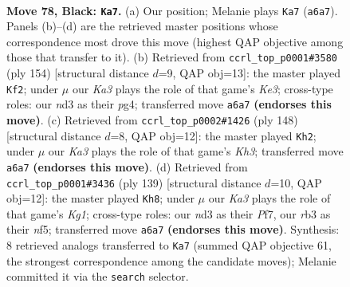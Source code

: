 \documentclass[11pt]{article}
\begin{document}
\clearpage

\begin{figure}[p]\centering
\begin{subfigure}{0.46\textwidth}\centering
\resizebox{\linewidth}{!}{%
\newchessgame
\chessboard[
  setfen={8/8/k7/8/7K/1R1N4/6P1/3r4 b - - 21 78},
  showmover=false,
  pgfstyle=straightmove, color=movearrow, markmove={a6-a7}
]}
\caption{}
\end{subfigure}\hfill
\begin{subfigure}{0.46\textwidth}\centering
\resizebox{\linewidth}{!}{%
\newchessgame
\chessboard[
  setfen={8/4k3/7P/6R1/r5p1/4K3/8/8 w - - 1 78},
  showmover=false,
  pgfstyle=straightmove, color=movearrow, markmove={e3-f2}
]}
\caption{}
\end{subfigure}
\\[4pt]
\begin{subfigure}{0.46\textwidth}\centering
\resizebox{\linewidth}{!}{%
\newchessgame
\chessboard[
  setfen={5r2/4R3/8/8/4n3/P4k1K/8/8 w - - 14 75},
  showmover=false,
  pgfstyle=straightmove, color=movearrow, markmove={h3-h2}
]}
\caption{}
\end{subfigure}\hfill
\begin{subfigure}{0.46\textwidth}\centering
\resizebox{\linewidth}{!}{%
\newchessgame
\chessboard[
  setfen={6k1/1K3p2/5R2/5N2/8/7r/8/8 b - - 2 70},
  showmover=false,
  pgfstyle=straightmove, color=movearrow, markmove={g8-h8}
]}
\caption{}
\end{subfigure}
\caption{\textbf{Move 78, Black: \texttt{Ka7}.} (a) Our position; Melanie plays \texttt{Ka7} (\texttt{a6a7}). Panels (b)--(d) are the retrieved master positions whose correspondence most drove this move (highest QAP objective among those that transfer to it). (b) Retrieved from \texttt{ccrl\_top\_p0001\#3580} (ply 154) [structural distance $d$=9, QAP obj=13]: the master played \texttt{Kf2}; under $\mu$ our \emph{Ka3} plays the role of that game's \emph{Ke3}; cross-type roles: our \emph{n}d3 as their \emph{p}g4; transferred move \texttt{a6a7} \textbf{(endorses this move)}. (c) Retrieved from \texttt{ccrl\_top\_p0002\#1426} (ply 148) [structural distance $d$=8, QAP obj=12]: the master played \texttt{Kh2}; under $\mu$ our \emph{Ka3} plays the role of that game's \emph{Kh3}; transferred move \texttt{a6a7} \textbf{(endorses this move)}. (d) Retrieved from \texttt{ccrl\_top\_p0001\#3436} (ply 139) [structural distance $d$=10, QAP obj=12]: the master played \texttt{Kh8}; under $\mu$ our \emph{Ka3} plays the role of that game's \emph{Kg1}; cross-type roles: our \emph{n}d3 as their \emph{P}f7, our \emph{r}b3 as their \emph{n}f5; transferred move \texttt{a6a7} \textbf{(endorses this move)}. Synthesis: 8 retrieved analogs transferred to \texttt{Ka7} (summed QAP objective 61, the strongest correspondence among the candidate moves); Melanie committed it via the \texttt{search} selector.}
\label{fig:thought-m155}
\end{figure}
\end{document}
